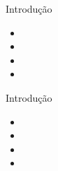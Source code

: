 \begin{frame}{Introdução}
\begin{itemize}
\item 
\item 
\item 
\item 
\end{itemize}
\end{frame}

\begin{frame}{Introdução}
    
    \begin{itemize}
        \item 
        \item 
        \item 
        \item 
    \end{itemize}
\end{frame}
